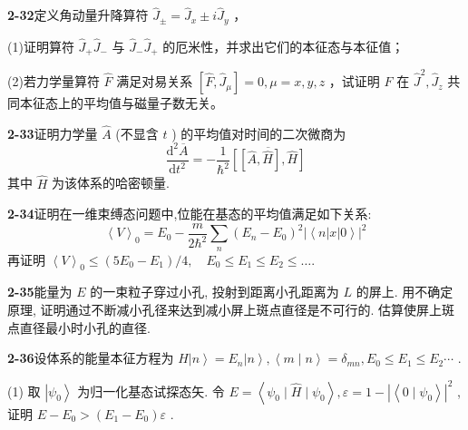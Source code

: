 \vfill

\newpage

\textbf{2-32}\quad 定义角动量升降算符 $\displaystyle \hat{J}_{\pm} = \hat{J}_x \pm i\hat{J}_y$ ，

(1)证明算符 $\displaystyle \hat{J}_{+}\hat{J}_{-}$ 与 $\displaystyle \hat{J}_{-}\hat{J}_{+}$ 的厄米性，并求出它们的本征态与本征值；

(2)若力学量算符 $\displaystyle \hat{F}$ 满足对易关系 $\displaystyle [\hat{F}, \hat{J}_{\mu}] = 0, \mu = x, y, z$ ，试证明 $\displaystyle \hat{F}$ 在 $\displaystyle \hat{J}^2, \hat{J}_z$ 共同本征态上的平均值与磁量子数无关。

\vfill

\newpage

\textbf{2-33}\quad 证明力学量 $\displaystyle \hat{A}$ (不显含 $\displaystyle t$ ) 的平均值对时间的二次微商为
$$
\dfrac {\mathrm{d} ^ {2} \overline {{A}}}{\mathrm{d} t ^ {2}} = - \dfrac {1}{\hbar^ {2}} \overline {{\left[ \left[ \hat {A} , \hat {H} \right] , \hat {H} \right]}}
$$
其中 $\displaystyle \hat{H}$ 为该体系的哈密顿量.

\vfill

\newpage

\textbf{2-34}\quad 证明在一维束缚态问题中,位能在基态的平均值满足如下关系:
$$
\left\langle V \right\rangle_ {0} = E _ {0} - \dfrac {m}{2 \hbar^ {2}} \sum_ {n} (E _ {n} - E _ {0}) ^ {2} \left| \left\langle n \right| x \left| 0 \right\rangle \right| ^ {2}
$$
再证明 $\displaystyle \left\langle V\right\rangle_0\leqslant (5E_0 - E_1) / 4,\quad E_0\leqslant E_1\leqslant E_2\leqslant \dots .$

\vfill

\newpage

\textbf{2-35}\quad 能量为 $\displaystyle E$ 的一束粒子穿过小孔, 投射到距离小孔距离为 $\displaystyle L$ 的屏上. 用不确定原理, 证明通过不断减小孔径来达到减小屏上斑点直径是不可行的. 估算使屏上斑点直径最小时小孔的直径.

\vfill

\newpage

\textbf{2-36}\quad 设体系的能量本征方程为 $\displaystyle \hat{H}\left|n\right\rangle = E_n\left|n\right\rangle, \left\langle m\mid n\right\rangle = \delta_{mn}, E_0 \leqslant E_1 \leqslant E_2 \cdots$ .

(1) 取 $\displaystyle \left|\psi_0\right\rangle$ 为归一化基态试探态矢. 令 $\displaystyle E = \left\langle \psi_0\mid \hat{H}\mid \psi_0\right\rangle, \varepsilon = 1 - \left|\left\langle 0\mid \psi_0\right\rangle\right|^2$ , 证明 $\displaystyle E - E_0 > (E_1 - E_0)\varepsilon$ .

